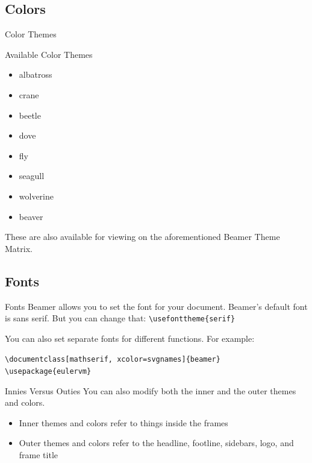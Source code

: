 \documentclass[mathserif, xcolor=svgnames]{beamer}
\begin{document}
\subsection{Colors}
\begin{frame}{Color Themes}


\begin{block}{Available Color Themes}
\begin{multicols}{2}
\begin{itemize}
\item albatross 
\item crane 
\item beetle 
\item dove
\item fly 
\item seagull 
\item wolverine
\item beaver
\end{itemize}
\end{multicols}
\end{block}
These are also available for viewing on the aforementioned Beamer Theme Matrix.
\end{frame}



\subsection{Fonts}
\begin{frame}[fragile]{Fonts}
Beamer allows you to set the font for your document.
\vspace{10pt}
Beamer's default font is sans serif. But you can change that:
\verb+\usefonttheme{serif}+

You can also set separate fonts for different functions. For example:

\verb+\documentclass[mathserif, xcolor=svgnames]{beamer}+
\verb+\usepackage{eulervm}+

\end{frame}

\begin{frame}[fragile]{Innies Versus Outies}
You can also modify both the inner and the outer themes and colors.

\begin{itemize}
\item<2 -> Inner themes and colors refer to things inside the frames
\item<3 -> Outer themes and colors refer to the headline, footline, sidebars, logo, and frame title
\end{itemize}



\end{frame}
\end{document}
